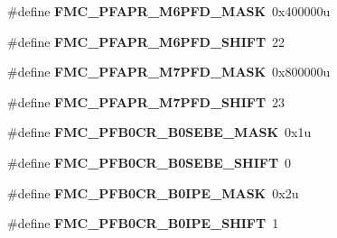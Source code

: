 \begin{DoxyCompactItemize}
\item 
\#define {\bfseries F\+M\+C\+\_\+\+P\+F\+A\+P\+R\+\_\+\+M6\+P\+F\+D\+\_\+\+M\+A\+SK}~0x400000u\hypertarget{group__FMC__Register__Masks_ga6d5a68ef8363082c0c7077c380e7aad6}{}\label{group__FMC__Register__Masks_ga6d5a68ef8363082c0c7077c380e7aad6}

\item 
\#define {\bfseries F\+M\+C\+\_\+\+P\+F\+A\+P\+R\+\_\+\+M6\+P\+F\+D\+\_\+\+S\+H\+I\+FT}~22\hypertarget{group__FMC__Register__Masks_ga5ff1d949214bab253e7b426ca8fb6884}{}\label{group__FMC__Register__Masks_ga5ff1d949214bab253e7b426ca8fb6884}

\item 
\#define {\bfseries F\+M\+C\+\_\+\+P\+F\+A\+P\+R\+\_\+\+M7\+P\+F\+D\+\_\+\+M\+A\+SK}~0x800000u\hypertarget{group__FMC__Register__Masks_gac0652379651a8388e65f2e96358b72f1}{}\label{group__FMC__Register__Masks_gac0652379651a8388e65f2e96358b72f1}

\item 
\#define {\bfseries F\+M\+C\+\_\+\+P\+F\+A\+P\+R\+\_\+\+M7\+P\+F\+D\+\_\+\+S\+H\+I\+FT}~23\hypertarget{group__FMC__Register__Masks_ga4589e8d60db033a3ab174e976a5d3dcf}{}\label{group__FMC__Register__Masks_ga4589e8d60db033a3ab174e976a5d3dcf}

\item 
\#define {\bfseries F\+M\+C\+\_\+\+P\+F\+B0\+C\+R\+\_\+\+B0\+S\+E\+B\+E\+\_\+\+M\+A\+SK}~0x1u\hypertarget{group__FMC__Register__Masks_ga9eede1bc45bf3cbaf00b4e9960f5e7eb}{}\label{group__FMC__Register__Masks_ga9eede1bc45bf3cbaf00b4e9960f5e7eb}

\item 
\#define {\bfseries F\+M\+C\+\_\+\+P\+F\+B0\+C\+R\+\_\+\+B0\+S\+E\+B\+E\+\_\+\+S\+H\+I\+FT}~0\hypertarget{group__FMC__Register__Masks_gac7bd1c5a4c5f35eb2d02351977e6a274}{}\label{group__FMC__Register__Masks_gac7bd1c5a4c5f35eb2d02351977e6a274}

\item 
\#define {\bfseries F\+M\+C\+\_\+\+P\+F\+B0\+C\+R\+\_\+\+B0\+I\+P\+E\+\_\+\+M\+A\+SK}~0x2u\hypertarget{group__FMC__Register__Masks_gab46173be15cdda210e83a041f8eeb809}{}\label{group__FMC__Register__Masks_gab46173be15cdda210e83a041f8eeb809}

\item 
\#define {\bfseries F\+M\+C\+\_\+\+P\+F\+B0\+C\+R\+\_\+\+B0\+I\+P\+E\+\_\+\+S\+H\+I\+FT}~1\hypertarget{group__FMC__Register__Masks_ga9fccb996200782cf4a1ec8d2418da2e5}{}\label{group__FMC__Register__Masks_ga9fccb996200782cf4a1ec8d2418da2e5}


\end{DoxyCompactItemize}
